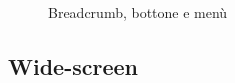 \documentclass[]{article}
\begin{document}
\begin{figure}[H]
	\centering
	\caption{Breadcrumb, bottone e menù}
\end{figure}

\subsection{Wide-screen}

\end{document}
